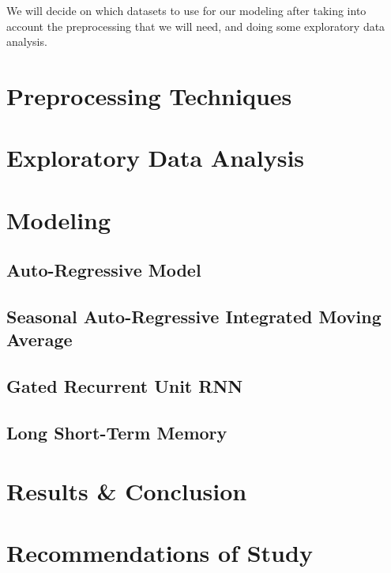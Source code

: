 \documentclass{article}
\begin{document}
	We will decide on which datasets to use for our modeling after taking into account the preprocessing that we will need, and 
	doing some exploratory data analysis. 

	\section{Preprocessing Techniques}
	\section{Exploratory Data Analysis}
	\section{Modeling}
	\subsection{Auto-Regressive Model}
	\subsection{Seasonal Auto-Regressive Integrated Moving Average}
	\subsection{Gated Recurrent Unit RNN}
	\subsection{Long Short-Term Memory}
	\section{Results \& Conclusion}
	\section{Recommendations of Study}
	
\end{document}
